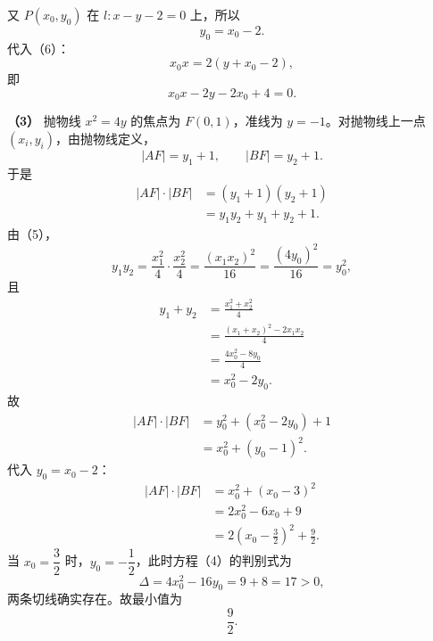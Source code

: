 \begin{answer}
又 $P(x_0,y_0)$ 在 $l:x-y-2=0$ 上，所以
\nopagebreak[4]
\[y_0=x_0-2.\]
代入（6）：
\nopagebreak[4]
\[x_0x=2(y+x_0-2),\]
即
\nopagebreak[4]
\[x_0x-2y-2x_0+4=0.\]

\textbf{（3）}
抛物线 $x^2=4y$ 的焦点为 $F(0,1)$，准线为 $y=-1$。对抛物线上一点 $(x_i,y_i)$，由抛物线定义，
\nopagebreak[4]
\[|AF|=y_1+1,\qquad |BF|=y_2+1.\]
于是
\nopagebreak[4]
\[\begin{aligned}
|AF|\cdot|BF|
&=(y_1+1)(y_2+1)\\
&=y_1y_2+y_1+y_2+1.
\end{aligned}\]
由（5），
\nopagebreak[4]
\[y_1y_2=\frac{x_1^2}{4}\cdot\frac{x_2^2}{4}
=\frac{(x_1x_2)^2}{16}
=\frac{(4y_0)^2}{16}=y_0^2,\]
且
\nopagebreak[4]
\[\begin{aligned}
y_1+y_2
&=\frac{x_1^2+x_2^2}{4}\\
&=\frac{(x_1+x_2)^2-2x_1x_2}{4}\\
&=\frac{4x_0^2-8y_0}{4}\\
&=x_0^2-2y_0.
\end{aligned}\]
故
\nopagebreak[4]
\[\begin{aligned}
|AF|\cdot|BF|
&=y_0^2+(x_0^2-2y_0)+1\\
&=x_0^2+(y_0-1)^2.
\end{aligned}\]
代入 $y_0=x_0-2$：
\nopagebreak[4]
\[\begin{aligned}
|AF|\cdot|BF|
&=x_0^2+(x_0-3)^2\\
&=2x_0^2-6x_0+9\\
&=2\left(x_0-\frac32\right)^2+\frac92.
\end{aligned}\]
当 $x_0=\dfrac32$ 时，$y_0=-\dfrac12$，此时方程（4）的判别式为
\nopagebreak[4]
\[\Delta=4x_0^2-16y_0=9+8=17>0,\]
两条切线确实存在。故最小值为
\nopagebreak[4]
\[\frac92.\]




\end{answer}
